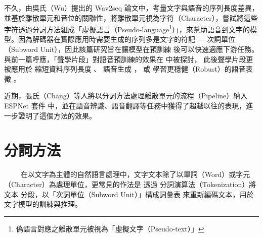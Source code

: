 不久，由吳氏（Wu）提出的 Wav2seq \cite{wu_wav2seq_2023}論文中，考量文字與語音的序列長度差異，並基於離散單元和音位的關聯性，將離散單元視為字符（Character），嘗試將這些字符透過分詞方法組成「虛擬語言（Pseudo-language\footnote{偽語言對應之離散單元被視為「虛擬文字（Pseudo-text）」}）」，來幫助語音到文字的模型。因為解碼器在實際應用時需要生成的序列多是文字的符記 --- 次詞單位（Subword Unit），因此該篇研究旨在讓模型在預訓練
後可以快速適應下游任務。
與前一篇呼應，「聲學片段」對語音預訓練的效果在
\cite{10096788}
中被探討，
此後聲學片段更被應用於
縮短資料序列長度\cite{chang_exploration_2023} 
、
語音生成
\cite{shen2024acoustic}，
或
學習更穩健（Robust）的語音表徵
\cite{chang2023r}。


近期，張氏（Chang）等人\cite{chang_exploring_2024}將以分詞方法處理離散單元的流程（Pipeline）納入 ESPNet 套件 \cite{watanabe2018espnet} 中，並在語音辨識、語音翻譯等任務中獲得了超越以往的表現，進一步證明了這個方法的效果。



\section{分詞方法}

　　
在以文字為主體的自然語言處理中，文字文本除了以單詞（Word）或字元（Character）為處理單位，更常見的作法是
透過
分詞演算法（Tokenization）將
文本
分段，以「次詞單位（Subword Unit）」構成詞彙表
來重新編碼文本，用於文字模型的訓練與推理。

